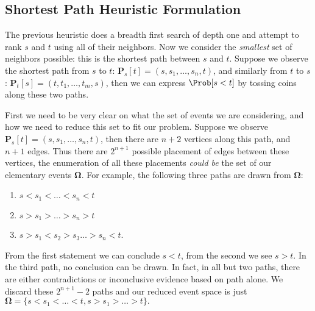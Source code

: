 \subsection{Shortest Path Heuristic Formulation}

The previous heuristic does a breadth first search of depth one and attempt to rank $s$ and $t$ using all of their neighbors. Now we consider the \textit{smallest} set of neighbors possible: this is the shortest path between $s$ and $t$. Suppose we observe the shortest path from $s$ to $t$: $\pmb{P}_s[t] = (s, s_1,\ldots,s_n, t)$, and similarly from $t$ to $s$: $\pmb{P}_t[s] = (t, t_1,\ldots,t_m, s)$, then we can express $\Prob[s < t]$ by tossing coins along these two paths.

First we need to be very clear on what the set of events we are considering, and how we need to reduce this set to fit our problem. Suppose we observe $\pmb{P}_s[t] = (s, s_1, \ldots, s_n, t)$, then there are $n+2$ vertices along this path, and $n+1$ edges. Thus there are $2^{n+1}$ possible placement of edges between these vertices, the enumeration of all these placements \textit{could be} the set of our elementary events $\pmb{\Omega}$. For example, the following three paths are drawn from $\pmb{\Omega}$:

\begin{enumerate}
	\item $s < s_1 < \ldots < s_n < t$
	\item $s > s_1 > \ldots > s_n > t$
	\item $s > s_1 < s_2 > s_3 \ldots > s_n < t$.
\end{enumerate}

From the first statement we can conclude $s < t$, from the second we see $s > t$. In the third path, no conclusion can be drawn. In fact, in all but two paths, there are either contradictions or inconclusive evidence based on path alone. We discard these $2^{n+1}-2$ paths and our reduced event space is just $\pmb{\Omega} = \{s < s_1 < \ldots < t, s > s_1 > \ldots > t\}.$


